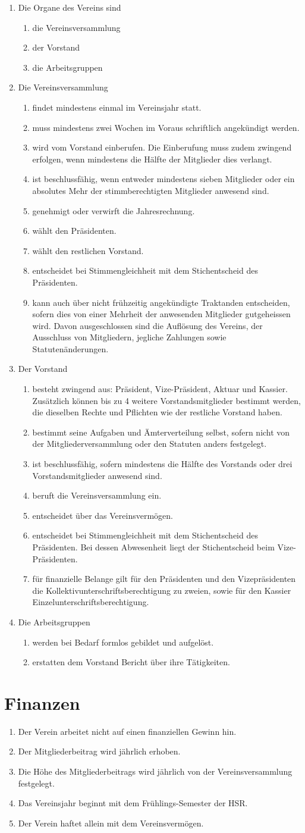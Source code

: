 \documentclass[10pt,a4paper,parskip,fleqn]{scrartcl}
\newcommand{\ol}{\begin{enumerate}[itemsep=-0.2em,topsep=-0.2em]}
\newcommand{\lo}{\end{enumerate}}
\newcommand{\li}{\item}
\begin{document}
\ol
  \li Die Organe des Vereins sind
    \ol
      \li die Vereinsversammlung
      \li der Vorstand
      \li die Arbeitsgruppen
    \lo
  \li Die Vereinsversammlung
    \ol
      \li findet mindestens einmal im Vereinsjahr statt.
      \li muss mindestens zwei Wochen im Voraus schriftlich angekündigt werden.
      \li wird vom Vorstand einberufen. Die Einberufung muss zudem zwingend
      erfolgen, wenn mindestens die Hälfte der Mitglieder dies verlangt.
      \li ist beschlussfähig, wenn entweder mindestens sieben Mitglieder oder
      ein absolutes Mehr der stimmberechtigten Mitglieder anwesend sind.
      \li genehmigt oder verwirft die Jahresrechnung.
      \li wählt den Präsidenten.
      \li wählt den restlichen Vorstand.
      \li entscheidet bei Stimmengleichheit mit dem Stichentscheid des
      Präsidenten.
      \li kann auch über nicht frühzeitig angekündigte Traktanden entscheiden,
      sofern dies von einer Mehrheit der anwesenden Mitglieder gutgeheissen
      wird.  Davon ausgeschlossen sind die Auflösung des Vereins, der Ausschluss
      von Mitgliedern, jegliche Zahlungen sowie Statutenänderungen.
    \lo
  \li Der Vorstand
    \ol
      \li besteht zwingend aus: Präsident, Vize-Präsident, Aktuar und Kassier.
      Zusätzlich können bis zu 4 weitere Vorstandsmitglieder bestimmt werden,
      die dieselben Rechte und Pflichten wie der restliche Vorstand haben.
      \li bestimmt seine Aufgaben und Ämterverteilung selbst, sofern nicht von
      der Mitgliederversammlung oder den Statuten anders festgelegt.
      \li ist beschlussfähig, sofern mindestens die Hälfte des Vorstands oder
      drei Vorstandsmitglieder anwesend sind.
      \li beruft die Vereinsversammlung ein.
      \li entscheidet über das Vereinsvermögen.
      \li entscheidet bei Stimmengleichheit mit dem Stichentscheid des
      Präsidenten. Bei dessen Abwesenheit liegt der Stichentscheid beim
      Vize-Präsidenten.
      \li für finanzielle Belange gilt für den Präsidenten und den
      Vizepräsidenten die Kollektiv\-unterschriftsberechtigung zu zweien, sowie
      für den Kassier Einzelunterschriftsberechtigung.
    \lo
  \li Die Arbeitsgruppen
    \ol
      \li werden bei Bedarf formlos gebildet und aufgelöst.
      \li erstatten dem Vorstand Bericht über ihre Tätigkeiten.
    \lo
\lo


\section{Finanzen}

\ol
  \li Der Verein arbeitet nicht auf einen finanziellen Gewinn hin.
  \li Der Mitgliederbeitrag wird jährlich erhoben.
  \li Die Höhe des Mitgliederbeitrags wird jährlich von der Vereinsversammlung
  festgelegt.
  \li Das Vereinsjahr beginnt mit dem Frühlings-Semester der HSR.
  \li Der Verein haftet allein mit dem Vereinsvermögen.
\lo
\end{document}
